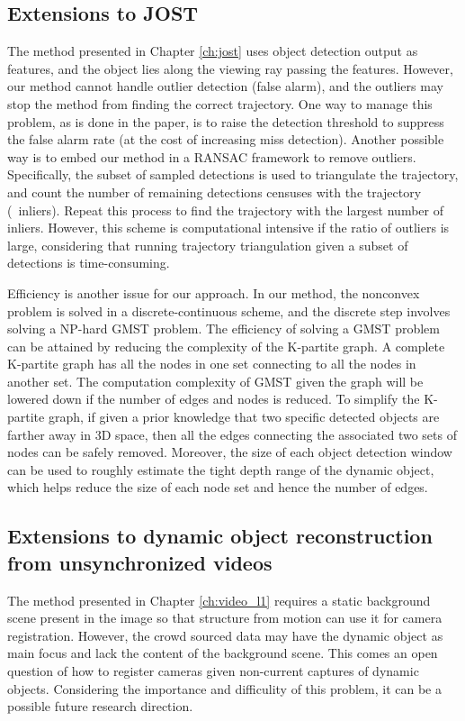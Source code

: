\subsection{Extensions to JOST}

The method presented in Chapter \ref{ch:jost} uses object detection output as features, and the object lies along the viewing ray passing the features. However, our method cannot handle outlier detection (false alarm), and the outliers may stop the method from finding the correct trajectory. One way to manage this problem, as is done in the paper, is to raise the detection threshold to suppress the false alarm rate (at the cost of increasing miss detection). Another possible way is to embed our method in a RANSAC framework \cite{Hartley2004} to remove outliers. Specifically, the subset of sampled detections is used to triangulate the trajectory, and count the number of remaining detections censuses with the trajectory (\ie~inliers). Repeat this process to find the trajectory with the largest number of inliers. However, this scheme is computational intensive if the ratio of outliers is large, considering that running trajectory triangulation given  a subset of detections is time-consuming. 

Efficiency is another issue for our approach. In our method, the nonconvex problem is solved in a discrete-continuous scheme, and the discrete step involves solving a NP-hard GMST problem. The efficiency of solving a GMST problem can be attained by reducing the complexity of the K-partite graph. A complete K-partite graph has all the nodes in one set connecting to all the nodes in another set. The computation complexity of GMST given the graph will be lowered down if the number of edges and nodes is reduced. To simplify the K-partite graph, if given a prior knowledge that two specific detected objects are farther away in 3D space, then all the edges connecting the associated two sets of nodes can be safely removed. Moreover, the size of each object detection window can be used to roughly estimate the tight depth range of the dynamic object, which helps reduce the size of each node set and hence the number of edges.


\subsection{Extensions to dynamic object reconstruction from unsynchronized videos}

The method presented in Chapter \ref{ch:video_l1} requires a static background scene present in the image so that structure from motion can use it for camera registration. However, the crowd sourced data may have the dynamic object as main focus and lack the content of the background scene. This comes an open question of how to register cameras given non-current captures of dynamic objects. Considering the importance and difficulity of this problem, it can be a possible future research direction.

